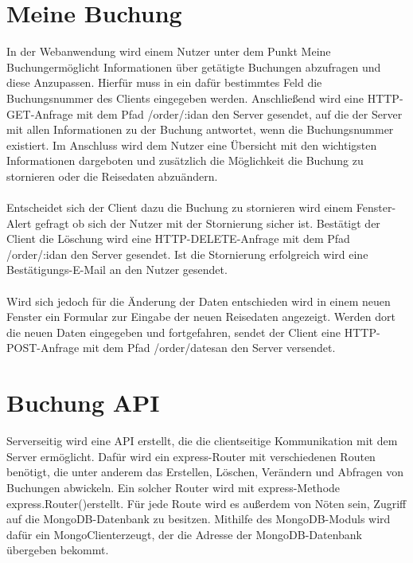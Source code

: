 \section{Meine Buchung}
In der Webanwendung wird einem Nutzer unter dem Punkt \glqq Meine Buchung\grqq \thickspace ermöglicht Informationen über getätigte Buchungen abzufragen und diese Anzupassen. Hierfür muss in ein dafür bestimmtes Feld die Buchungsnummer des Clients eingegeben werden. Anschließend wird eine HTTP-GET-Anfrage mit dem Pfad \glqq /order/:id\grqq \thickspace an den Server gesendet, auf die der Server mit allen Informationen zu der Buchung antwortet, wenn die Buchungsnummer existiert. Im Anschluss wird dem Nutzer eine Übersicht mit den wichtigsten Informationen dargeboten und zusätzlich die Möglichkeit die Buchung zu stornieren oder die Reisedaten abzuändern.
\\
\\
Entscheidet sich der Client dazu die Buchung zu stornieren wird einem Fenster-Alert gefragt ob sich der Nutzer mit der Stornierung sicher ist. Bestätigt der Client die Löschung wird eine HTTP-DELETE-Anfrage mit dem Pfad \glqq /order/:id\grqq \thickspace an den Server gesendet. Ist die Stornierung erfolgreich wird eine Bestätigungs-E-Mail an den Nutzer gesendet.
\\
\\
Wird sich jedoch für die Änderung der Daten entschieden wird in einem neuen Fenster ein Formular zur Eingabe der neuen Reisedaten angezeigt. Werden dort die neuen Daten eingegeben und fortgefahren, sendet der Client eine HTTP-POST-Anfrage mit dem Pfad \glqq /order/dates\grqq \thickspace an den Server versendet.

\section{Buchung API}
Serverseitig wird eine API erstellt, die die clientseitige Kommunikation mit dem Server ermöglicht. Dafür wird ein express-Router mit verschiedenen Routen benötigt, die unter anderem das Erstellen, Löschen, Verändern und Abfragen von Buchungen abwickeln. Ein solcher Router wird mit express-Methode \glqq express.Router()\grqq \thinspace erstellt. Für jede Route wird es außerdem von Nöten sein, Zugriff auf die MongoDB-Datenbank zu besitzen. Mithilfe des MongoDB-Moduls wird dafür ein \glqq MongoClient\grqq \thinspace erzeugt, der die Adresse der MongoDB-Datenbank übergeben bekommt.


